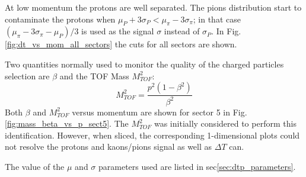 At low momentum the protons are well separated.  The pions distribution 
start to contaminate the protons when
$\mu_{P} + 3\sigma_{P} < \mu_{\pi} - 3\sigma_{\pi}$;  in that case 
$(\mu_{\pi} - 3\sigma_{\pi} - \mu_{P})/3$ is used as the signal $\sigma$ instead of $\sigma_{P}$.
In Fig.\ref{fig:dt_vs_mom_all_sectors} the cuts for all sectors are shown. 

Two quantities normally used to monitor the quality of the charged particles
selection are $\beta$ and the TOF Mass $M_{TOF}^2$:
$$
 M_{TOF}^2 = \frac{p^2(1-\beta^2)}{\beta^2}
$$
Both $\beta$ and $M_{TOF}^2$ versus momentum are shown for sector 5 in 
Fig.\ref{fig:mass_beta_vs_p_sect5}. The $M_{TOF}^2$ was initially considered
to perform this identification. However, when sliced, the corresponding
1-dimensional plots could not resolve the protons and kaons/pions signal 
as well as $\Delta T$ can.

The value of the $\mu$ and $\sigma$ parameters used are listed in sec\ref{sec:dtp_parameters}.


